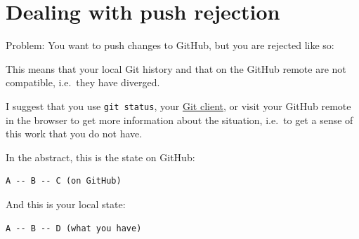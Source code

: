\documentclass[
]{book}
\newenvironment{Shaded}{\begin{snugshade}}{\end{snugshade}}
\newcommand{\AttributeTok}[1]{\textcolor[rgb]{0.13,0.29,0.53}{#1}}
\newcommand{\ErrorTok}[1]{\textcolor[rgb]{0.64,0.00,0.00}{\textbf{#1}}}
\newcommand{\ExtensionTok}[1]{#1}
\newcommand{\KeywordTok}[1]{\textcolor[rgb]{0.13,0.29,0.53}{\textbf{#1}}}
\newcommand{\NormalTok}[1]{#1}
\newcommand{\OperatorTok}[1]{\textcolor[rgb]{0.81,0.36,0.00}{\textbf{#1}}}
\newcommand{\OtherTok}[1]{\textcolor[rgb]{0.56,0.35,0.01}{#1}}
\newcommand{\StringTok}[1]{\textcolor[rgb]{0.31,0.60,0.02}{#1}}
\begin{document}
\chapter{Dealing with push rejection}\label{push-rejected}

Problem: You want to push changes to GitHub, but you are rejected like so:

\begin{Shaded}
\end{Shaded}

This means that your local Git history and that on the GitHub remote are not compatible, i.e.~they have diverged.

I suggest that you use \texttt{git\ status}, your \hyperref[git-client]{Git client}, or visit your GitHub remote in the browser to get more information about the situation, i.e.~to get a sense of this work that you do not have.

In the abstract, this is the state on GitHub:

\begin{verbatim}
A -- B -- C (on GitHub)
\end{verbatim}

And this is your local state:

\begin{verbatim}
A -- B -- D (what you have)
\end{verbatim}
\end{document}
